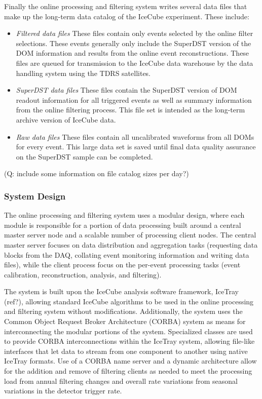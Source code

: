Finally the online processing and filtering system writes several data files that make up the long-term data catalog of the IceCube
experiment.  These include:
\begin{itemize}
\item \emph {Filtered data files} These files contain only events selected by the online filter selections.  These events
generally only include the SuperDST version of the DOM information and results from the online event reconstructions.  These
files are queued for transmission to the IceCube data warehouse by the data handling system using the TDRS satellites. 
\item \emph {SuperDST data files} These files contain the SuperDST version of DOM readout information for all triggered events as well as summary
information from the online filtering process.  This file set is intended as the long-term archive version of IceCube data.
\item \emph {Raw data files}  These files contain all uncalibrated waveforms from all DOMs for every event.  This large data
set is saved until final data quality assurance on the SuperDST sample can be completed.
\end{itemize}

(Q:  include some information on file catalog sizes per day?)

\subsubsection{System Design}

The online processing and filtering system uses a modular design, where each module
is responsible for a portion of data processing built around a central master server node and a
scalable number of processing client nodes.  The central master server focuses on
data distribution and aggregation tasks (requesting data blocks from the DAQ, collating event
monitoring information and writing data files), while the client process focus on the per-event
processing tasks (event calibration, reconstruction, analysis, and filtering).  

The system is built upon the IceCube analysis software framework, IceTray (ref?), allowing standard IceCube algorithms to
be used in the online processing and filtering system without modifications.  Additionally, the system uses the 
Common Object Request Broker Architecture (CORBA) system as means for interconnecting
the modular portions of the system.  Specialized classes are used to provide CORBA interconnections
within the IceTray system, allowing file-like interfaces that let data to stream from one component to another 
using native IceTray formats.  Use of a CORBA name server and a dynamic architecture allow for the
addition and remove of filtering clients as needed to meet the processing load from annual filtering
changes and overall rate variations from seasonal variations in the detector trigger rate.

